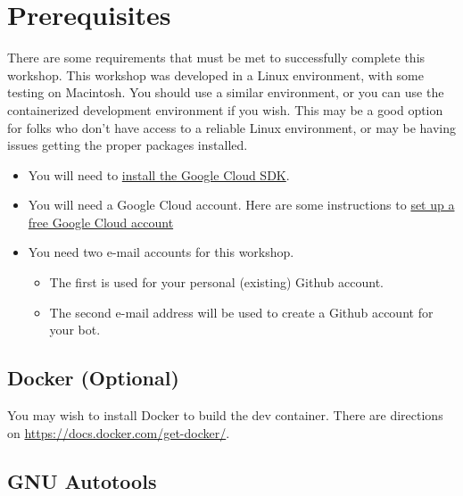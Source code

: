 \section{\label{sec:preparation}Prerequisites}

\justifying
There are some requirements that must be met to successfully complete this workshop. This workshop was developed in a Linux environment, with some testing on Macintosh. You should use a similar environment, or you can use the containerized development environment if you wish. This may be a good option for folks who don't have access to a reliable Linux environment, or may be having issues getting the proper packages installed.

\begin{raggedright}
    \begin{itemize}
        \item You will need to \href{https://cloud.google.com/sdk/docs/install}{install the Google Cloud SDK}.
        \item You will need a Google Cloud account. Here are some instructions to \href{https://cloud.google.com/free/}{set up a free Google Cloud account}
        \item You need two e-mail accounts for this workshop.
        \begin{itemize}
            \item The first is used for your personal (existing) Github account.
            \item The second e-mail address will be used to create a Github account for your bot.
	   \end{itemize}
    \end{itemize}
\end{raggedright}
\vspace{2mm}

\subsection{\label{sec:docker}Docker (Optional)}

\justifying
You may wish to install Docker to build the dev container. There are directions on \href{how to install Docker on their website}{https://docs.docker.com/get-docker/}.

\subsection{\label{sec:autotools}GNU Autotools}

